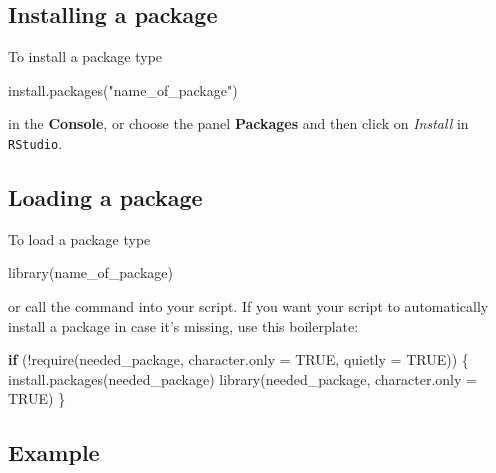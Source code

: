 \documentclass[
  letterpaper,
  DIV=11,
  numbers=noendperiod]{scrreprt}
\newenvironment{Shaded}{\begin{snugshade}}{\end{snugshade}}
\newcommand{\AttributeTok}[1]{\textcolor[rgb]{0.40,0.45,0.13}{#1}}
\newcommand{\ConstantTok}[1]{\textcolor[rgb]{0.56,0.35,0.01}{#1}}
\newcommand{\ControlFlowTok}[1]{\textcolor[rgb]{0.00,0.23,0.31}{\textbf{#1}}}
\newcommand{\FunctionTok}[1]{\textcolor[rgb]{0.28,0.35,0.67}{#1}}
\newcommand{\NormalTok}[1]{\textcolor[rgb]{0.00,0.23,0.31}{#1}}
\newcommand{\SpecialCharTok}[1]{\textcolor[rgb]{0.37,0.37,0.37}{#1}}
\newcommand{\StringTok}[1]{\textcolor[rgb]{0.13,0.47,0.30}{#1}}
\begin{document}
\subsection*{Installing a package}\label{installing-a-package}

To install a package type

\begin{Shaded}
\begin{Highlighting}[]
\FunctionTok{install.packages}\NormalTok{(}\StringTok{"name\_of\_package"}\NormalTok{)}
\end{Highlighting}
\end{Shaded}

in the \textbf{Console}, or choose the panel \textbf{Packages} and then
click on \emph{Install} in \texttt{RStudio}.

\subsection*{Loading a package}\label{loading-a-package}

To load a package type

\begin{Shaded}
\begin{Highlighting}[]
\FunctionTok{library}\NormalTok{(name\_of\_package)}
\end{Highlighting}
\end{Shaded}

or call the command into your script. If you want your script to
automatically install a package in case it's missing, use this
boilerplate:

\begin{Shaded}
\begin{Highlighting}[]
\ControlFlowTok{if}\NormalTok{ (}\SpecialCharTok{!}\FunctionTok{require}\NormalTok{(needed\_package, }\AttributeTok{character.only =} \ConstantTok{TRUE}\NormalTok{, }\AttributeTok{quietly =} \ConstantTok{TRUE}\NormalTok{)) \{}
    \FunctionTok{install.packages}\NormalTok{(needed\_package)}
    \FunctionTok{library}\NormalTok{(needed\_package, }\AttributeTok{character.only =} \ConstantTok{TRUE}\NormalTok{)}
\NormalTok{\}}
\end{Highlighting}
\end{Shaded}

\subsection*{Example}\label{example}
\end{document}
